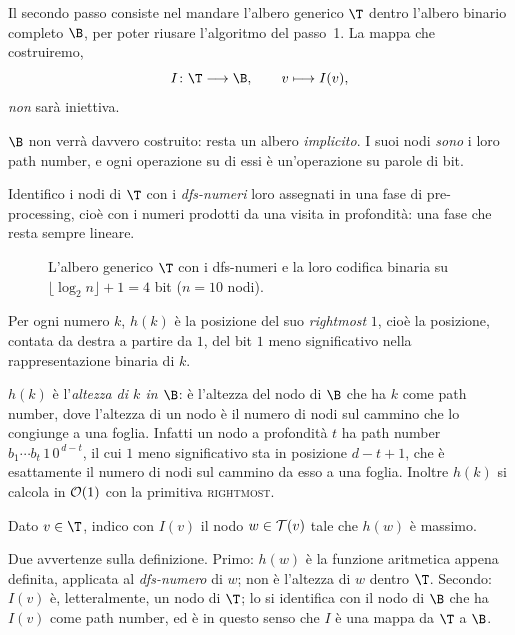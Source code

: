 Il secondo passo consiste nel mandare l'albero generico $\T$ dentro l'albero binario
completo $\B$, per poter riusare l'algoritmo del passo~1. La mappa che costruiremo,
\[
  I \colon \T \longrightarrow \B, \qquad v \longmapsto I(v),
\]
\emph{non} sarà iniettiva.

\begin{osservazione}
  $\B$ non verrà davvero costruito: resta un albero \emph{implicito}. I suoi nodi
  \emph{sono} i loro path number, e ogni operazione su di essi è un'operazione su
  parole di bit.
\end{osservazione}

Identifico i nodi di $\T$ con i \emph{dfs-numeri} loro assegnati in una fase di
pre-processing, cioè con i numeri prodotti da una visita in profondità: una fase che
resta sempre lineare.

\begin{figure}[H]
  \centering
  
  \caption{L'albero generico $\T$ con i dfs-numeri e la loro codifica binaria su
    $\lfloor\log_2 n\rfloor+1 = 4$ bit ($n=10$ nodi).}
  \label{fig:lca-albero-I}
\end{figure}

\begin{definizione}[la funzione $h$]\label{def:h}
  Per ogni numero $k$, $h(k)$ è la posizione del suo \emph{rightmost} $1$, cioè la
  posizione, contata da destra a partire da $1$, del bit $1$ meno significativo nella
  rappresentazione binaria di $k$.
\end{definizione}

\begin{osservazione}
  $h(k)$ è l'\emph{altezza di $k$ in $\B$}: è l'altezza del nodo di $\B$ che ha $k$
  come path number, dove l'altezza di un nodo è il numero di nodi sul cammino che lo
  congiunge a una foglia. Infatti un nodo a profondità $t$ ha path number
  $b_1\cdots b_t\,1\,0^{\,d-t}$, il cui $1$ meno significativo sta in posizione
  $d-t+1$, che è esattamente il numero di nodi sul cammino da esso a una foglia.
  Inoltre $h(k)$ si calcola in $\mathcal{O}(1)$ con la primitiva \textsc{rightmost}.
\end{osservazione}

\begin{definizione}[la mappa $I$]\label{def:mappa-I}
  Dato $v \in \T$, indico con $I(v)$ il nodo $w \in \mathcal{T}(v)$ tale che $h(w)$ è
  massimo.
\end{definizione}

\begin{osservazione}
  Due avvertenze sulla definizione. Primo: $h(w)$ è la funzione aritmetica appena
  definita, applicata al \emph{dfs-numero} di $w$; non è l'altezza di $w$ dentro $\T$.
  Secondo: $I(v)$ è, letteralmente, un nodo di $\T$; lo si identifica con il nodo di
  $\B$ che ha $I(v)$ come path number, ed è in questo senso che $I$ è una mappa da
  $\T$ a $\B$.
\end{osservazione}

